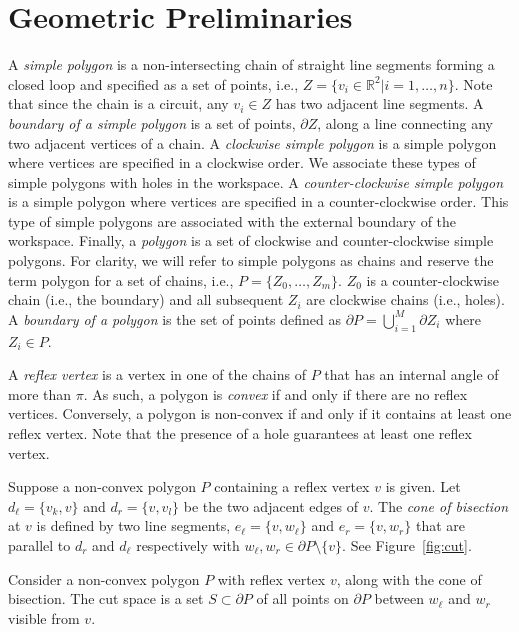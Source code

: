 \documentclass[../main.tex]{subfiles}
\begin{document}
\section{Geometric Preliminaries}
\label{section:background_geometry}

A \emph{simple polygon} is a non-intersecting chain of straight line segments forming a closed loop and specified as a set of points, i.e., $Z=\{v_i\in\mathbb{R}^2|i=1,\ldots,n\}$. Note that since the chain is a circuit, any $v_i\in Z$ has two adjacent line segments. A \emph{boundary of a simple polygon} is a set of points, $\partial Z$, along a line connecting any two adjacent vertices of a chain. A \emph{clockwise simple polygon} is a simple polygon where vertices are specified in a clockwise order. We associate these types of simple polygons with holes in the workspace. A \emph{counter-clockwise simple polygon} is a simple polygon where vertices are specified in a counter-clockwise order. This type of simple polygons are associated with the external boundary of the workspace. Finally, a \emph{polygon} is a set of clockwise and counter-clockwise simple polygons. For clarity, we will refer to simple polygons as chains and reserve the term polygon for a set of chains, i.e., $P=\{Z_0,\ldots,Z_m\}$. $Z_0$ is a counter-clockwise chain (i.e., the boundary) and all subsequent $Z_i$ are clockwise chains (i.e., holes). A \emph{boundary of a polygon} is the set of points defined as $\partial P=\bigcup^M_{i=1}\partial Z_i$ where $Z_i\in P$.

A \emph{reflex vertex} is a vertex in one of the chains of $P$ that has an internal angle of more than $\pi$. As such, a polygon is \emph{convex} if and only if there are no reflex vertices. Conversely, a polygon is non-convex if and only if it contains at least one reflex vertex. Note that the presence of a hole guarantees at least one reflex vertex.

\begin{definition}
\label{def:cone_of_bisection}
Suppose a non-convex polygon $P$ containing a reflex vertex $v$ is given. Let $d_{\ell}=\{v_k, v\}$ and $d_r=\{v, v_l\}$ be the two adjacent edges of $v$. The \emph{cone of bisection} at $v$ is defined by two line segments, $e_{\ell}=\{v, w_{\ell}\}$ and $e_r=\{v, w_{r}\}$ that are parallel to $d_r$ and $d_{\ell}$ respectively with $w_{\ell}, w_{r}\in{\partial P\setminus\{v\}}$. See Figure~\ref{fig:cut}.
\end{definition}

\begin{definition}
\label{def:cut_space}
Consider a non-convex polygon $P$ with reflex vertex $v$, along with the cone of bisection. The cut space is a set $S\subset\partial P$ of all points on $\partial P$ between $w_{\ell}$ and $w_{r}$ visible from $v$.
\end{definition}
\end{document}
